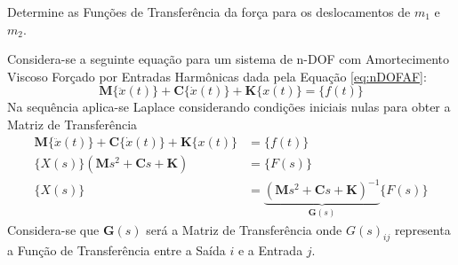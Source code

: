 \documentclass{article}
\begin{document}
\newpage\begin{exercise}\label{ex6}
    Determine as Funções de Transferência da força para os deslocamentos de $m_1$ e $m_2$.
\end{exercise}
\begin{resolution}
    Considera-se a seguinte equação para um sistema de n-DOF com Amortecimento Viscoso Forçado por Entradas Harmônicas dada pela Equação \ref{eq:nDOFAF}:
    \begin{equation*}
        \mathbf{M}\{\ddot{x}(t)\} + \mathbf{C}\{\dot{x}(t)\} + \mathbf{K}\{x(t)\} = \{f(t)\}
    \end{equation*}
    Na sequência aplica-se Laplace considerando condições iniciais nulas para obter a Matriz de Transferência
    \begin{align*}
        \mathbf{M}\{\ddot{x}(t)\} + \mathbf{C}\{\dot{x}(t)\} + \mathbf{K}\{x(t)\} &= \{f(t)\}\\
        \{X(s)\}(\mathbf{M}s^2 + \mathbf{C}s + \mathbf{K}) &= \{F(s)\}\\
        \{X(s)\} &= \underbrace{(\mathbf{M}s^2 + \mathbf{C}s + \mathbf{K})^{-1}}_{\mathbf{G}(s)}\{F(s)\}
    \end{align*}
    Considera-se que $\mathbf{G}(s)$ será a Matriz de Transferência onde $G(s)_{ij}$ representa a Função de Transferência entre a Saída $i$ e a Entrada $j$.\\
    

\end{resolution}
\end{document}
